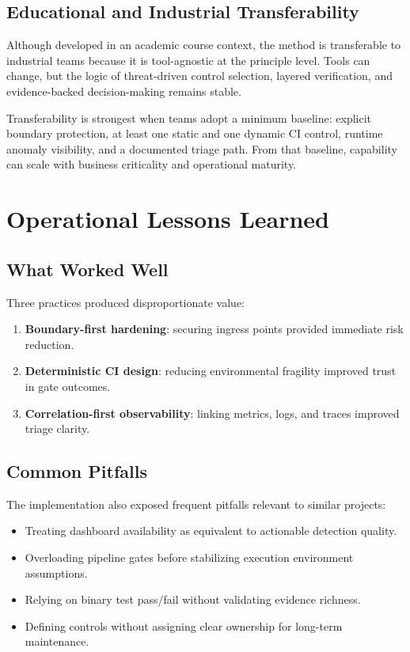 \documentclass[conference]{IEEEtran}
\begin{document}
\subsection{Educational and Industrial Transferability}
Although developed in an academic course context, the method is transferable to industrial teams because it is tool-agnostic at the principle level. Tools can change, but the logic of threat-driven control selection, layered verification, and evidence-backed decision-making remains stable.

Transferability is strongest when teams adopt a minimum baseline: explicit boundary protection, at least one static and one dynamic CI control, runtime anomaly visibility, and a documented triage path. From that baseline, capability can scale with business criticality and operational maturity.

\section{Operational Lessons Learned}
\subsection{What Worked Well}
Three practices produced disproportionate value:
\begin{enumerate}
\item \textbf{Boundary-first hardening}: securing ingress points provided immediate risk reduction.
\item \textbf{Deterministic CI design}: reducing environmental fragility improved trust in gate outcomes.
\item \textbf{Correlation-first observability}: linking metrics, logs, and traces improved triage clarity.
\end{enumerate}

\subsection{Common Pitfalls}
The implementation also exposed frequent pitfalls relevant to similar projects:
\begin{itemize}
\item Treating dashboard availability as equivalent to actionable detection quality.
\item Overloading pipeline gates before stabilizing execution environment assumptions.
\item Relying on binary test pass/fail without validating evidence richness.
\item Defining controls without assigning clear ownership for long-term maintenance.
\end{itemize}
\end{document}
